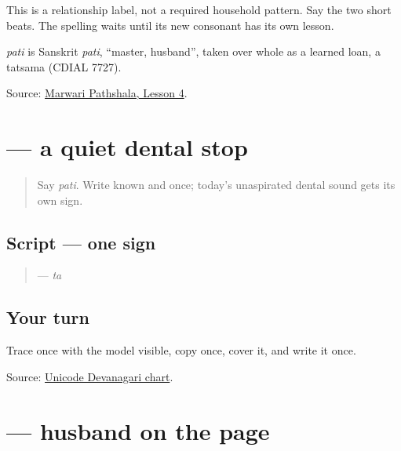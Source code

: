 This is a relationship label, not a required household pattern. Say the two short beats. The spelling waits until its new consonant has its own lesson.

\begin{cousinweb}
\emph{pati} is Sanskrit \emph{pati}, \textquotedblleft{}master, husband\textquotedblright{}, taken over whole as a learned loan, a tatsama (CDIAL 7727).
\end{cousinweb}

\begin{tcolorbox}[breakable,colback=teal!4,colframe=teal!35!black,title={Before you move on}]
Source: \href{https://www.marwaripathshala.com/marwari-lesson-4-english}{Marwari Pathshala, Lesson 4}.
\end{tcolorbox}
\section[\texorpdfstring{\mw{त} (ta)}{त (ta)}]{ — a quiet dental stop}

\label{lesson:MW-W09-ta}



\begin{quote}
Say \emph{pati}. Write known \textbf{} and \textbf{} once; today's unaspirated dental sound gets its own sign.
\end{quote}

\subsection*{Script — one sign}

\begin{quote}
\textbf{} — \emph{ta}
\end{quote}

\subsection*{Your turn}
Trace once with the model visible, copy once, cover it, and write it once.

\begin{tcolorbox}[breakable,colback=teal!4,colframe=teal!35!black,title={Before you move on}]
Source: \href{https://www.unicode.org/charts/PDF/U0900.pdf}{Unicode Devanagari chart}.
\end{tcolorbox}
\section[\texorpdfstring{\mw{पति} (pati)}{पति (pati)}]{ — husband on the page}

